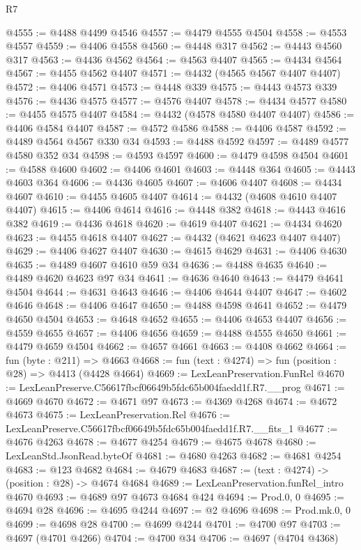 \begin{lexlean}{R7}
\begin{coremodule}
@4555 := @4488 @4499 @4546
@4557 := @4479 @4555 @4504
@4558 := @4553 @4557
@4559 := @4406 @4558
@4560 := @4448 @317
@4562 := @4443 @4560 @317
@4563 := @4436 @4562
@4564 := @4563 @4407
@4565 := @4434 @4564
@4567 := @4455 @4562 @4407
@4571 := @4432 (@4565 @4567 @4407 @4407)
@4572 := @4406 @4571
@4573 := @4448 @339
@4575 := @4443 @4573 @339
@4576 := @4436 @4575
@4577 := @4576 @4407
@4578 := @4434 @4577
@4580 := @4455 @4575 @4407
@4584 := @4432 (@4578 @4580 @4407 @4407)
@4586 := @4406 @4584 @4407
@4587 := @4572 @4586
@4588 := @4406 @4587
@4592 := @4489 @4564 @4567 @330 @34
@4593 := @4488 @4592
@4597 := @4489 @4577 @4580 @352 @34
@4598 := @4593 @4597
@4600 := @4479 @4598 @4504
@4601 := @4588 @4600
@4602 := @4406 @4601
@4603 := @4448 @364
@4605 := @4443 @4603 @364
@4606 := @4436 @4605
@4607 := @4606 @4407
@4608 := @4434 @4607
@4610 := @4455 @4605 @4407
@4614 := @4432 (@4608 @4610 @4407 @4407)
@4615 := @4406 @4614
@4616 := @4448 @382
@4618 := @4443 @4616 @382
@4619 := @4436 @4618
@4620 := @4619 @4407
@4621 := @4434 @4620
@4623 := @4455 @4618 @4407
@4627 := @4432 (@4621 @4623 @4407 @4407)
@4629 := @4406 @4627 @4407
@4630 := @4615 @4629
@4631 := @4406 @4630
@4635 := @4489 @4607 @4610 @59 @34
@4636 := @4488 @4635
@4640 := @4489 @4620 @4623 @97 @34
@4641 := @4636 @4640
@4643 := @4479 @4641 @4504
@4644 := @4631 @4643
@4646 := @4406 @4644 @4407
@4647 := @4602 @4646
@4648 := @4406 @4647
@4650 := @4488 @4598 @4641
@4652 := @4479 @4650 @4504
@4653 := @4648 @4652
@4655 := @4406 @4653 @4407
@4656 := @4559 @4655
@4657 := @4406 @4656
@4659 := @4488 @4555 @4650
@4661 := @4479 @4659 @4504
@4662 := @4657 @4661
@4663 := @4408 @4662
@4664 := fun (byte : @211) => @4663
@4668 := fun (text : @4274) => fun (position : @28) => @4413 (@4428 @4664)
@4669 := LexLeanPreservation.FunRel
@4670 := LexLeanPreserve.C56617fbcf06649b5fdc65b004faedd1f.R7.__prog
@4671 := @4669 @4670
@4672 := @4671 @97
@4673 := @4369 @4268
@4674 := @4672 @4673
@4675 := LexLeanPreservation.Rel
@4676 := LexLeanPreserve.C56617fbcf06649b5fdc65b004faedd1f.R7.__fits_1
@4677 := @4676 @4263
@4678 := @4677 @4254
@4679 := @4675 @4678
@4680 := LexLeanStd.JsonRead.byteOf
@4681 := @4680 @4263
@4682 := @4681 @4254
@4683 := @123 @4682
@4684 := @4679 @4683
@4687 := (text : @4274) -> (position : @28) -> @4674 @4684
@4689 := LexLeanPreservation.funRel_intro @4670
@4693 := @4689 @97 @4673 @4684 @424
@4694 := Prod.{0, 0}
@4695 := @4694 @28
@4696 := @4695 @4244
@4697 := @2 @4696
@4698 := Prod.mk.{0, 0}
@4699 := @4698 @28
@4700 := @4699 @4244
@4701 := @4700 @97
@4703 := @4697 (@4701 @4266)
@4704 := @4700 @34
@4706 := @4697 (@4704 @4368)

\end{coremodule}
\end{lexlean}
